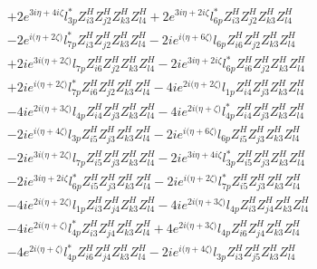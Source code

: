\begin{align}
 &+2 e^{3 i \eta +4 i \zeta } l_{3p}^* Z_{{i 3}}^{H} Z_{{j 2}}^{H} Z_{{k 3}}^{H} Z_{{l 4}}^{H} +2 e^{3 i \eta +2 i \zeta } l_{6p}^* Z_{{i 3}}^{H} Z_{{j 2}}^{H} Z_{{k 3}}^{H} Z_{{l 4}}^{H} \nonumber \\ 
 &-2 e^{i \Big(\eta +2 \zeta \Big)} l_{7p}^* Z_{{i 3}}^{H} Z_{{j 2}}^{H} Z_{{k 3}}^{H} Z_{{l 4}}^{H} -2 i e^{i \Big(\eta +6 \zeta \Big)} l_{6p} Z_{{i 6}}^{H} Z_{{j 2}}^{H} Z_{{k 3}}^{H} Z_{{l 4}}^{H} \nonumber \\ 
 &+2 i e^{3 i \Big(\eta +2 \zeta \Big)} l_{7p} Z_{{i 6}}^{H} Z_{{j 2}}^{H} Z_{{k 3}}^{H} Z_{{l 4}}^{H} -2 i e^{3 i \eta +2 i \zeta } l_{6p}^* Z_{{i 6}}^{H} Z_{{j 2}}^{H} Z_{{k 3}}^{H} Z_{{l 4}}^{H} \nonumber \\ 
 &+2 i e^{i \Big(\eta +2 \zeta \Big)} l_{7p}^* Z_{{i 6}}^{H} Z_{{j 2}}^{H} Z_{{k 3}}^{H} Z_{{l 4}}^{H} -4 i e^{2 i \Big(\eta +2 \zeta \Big)} l_{1p} Z_{{i 4}}^{H} Z_{{j 3}}^{H} Z_{{k 3}}^{H} Z_{{l 4}}^{H} \nonumber \\ 
 &-4 i e^{2 i \Big(\eta +3 \zeta \Big)} l_{4p} Z_{{i 4}}^{H} Z_{{j 3}}^{H} Z_{{k 3}}^{H} Z_{{l 4}}^{H} -4 i e^{2 i \Big(\eta +\zeta \Big)} l_{4p}^* Z_{{i 4}}^{H} Z_{{j 3}}^{H} Z_{{k 3}}^{H} Z_{{l 4}}^{H} \nonumber \\ 
 &-2 i e^{i \Big(\eta +4 \zeta \Big)} l_{3p} Z_{{i 5}}^{H} Z_{{j 3}}^{H} Z_{{k 3}}^{H} Z_{{l 4}}^{H} -2 i e^{i \Big(\eta +6 \zeta \Big)} l_{6p} Z_{{i 5}}^{H} Z_{{j 3}}^{H} Z_{{k 3}}^{H} Z_{{l 4}}^{H} \nonumber \\ 
 &-2 i e^{3 i \Big(\eta +2 \zeta \Big)} l_{7p} Z_{{i 5}}^{H} Z_{{j 3}}^{H} Z_{{k 3}}^{H} Z_{{l 4}}^{H} -2 i e^{3 i \eta +4 i \zeta } l_{3p}^* Z_{{i 5}}^{H} Z_{{j 3}}^{H} Z_{{k 3}}^{H} Z_{{l 4}}^{H} \nonumber \\ 
 &-2 i e^{3 i \eta +2 i \zeta } l_{6p}^* Z_{{i 5}}^{H} Z_{{j 3}}^{H} Z_{{k 3}}^{H} Z_{{l 4}}^{H} -2 i e^{i \Big(\eta +2 \zeta \Big)} l_{7p}^* Z_{{i 5}}^{H} Z_{{j 3}}^{H} Z_{{k 3}}^{H} Z_{{l 4}}^{H} \nonumber \\ 
 &-4 i e^{2 i \Big(\eta +2 \zeta \Big)} l_{1p} Z_{{i 3}}^{H} Z_{{j 4}}^{H} Z_{{k 3}}^{H} Z_{{l 4}}^{H} -4 i e^{2 i \Big(\eta +3 \zeta \Big)} l_{4p} Z_{{i 3}}^{H} Z_{{j 4}}^{H} Z_{{k 3}}^{H} Z_{{l 4}}^{H} \nonumber \\ 
 &-4 i e^{2 i \Big(\eta +\zeta \Big)} l_{4p}^* Z_{{i 3}}^{H} Z_{{j 4}}^{H} Z_{{k 3}}^{H} Z_{{l 4}}^{H} +4 e^{2 i \Big(\eta +3 \zeta \Big)} l_{4p} Z_{{i 6}}^{H} Z_{{j 4}}^{H} Z_{{k 3}}^{H} Z_{{l 4}}^{H} \nonumber \\ 
 &-4 e^{2 i \Big(\eta +\zeta \Big)} l_{4p}^* Z_{{i 6}}^{H} Z_{{j 4}}^{H} Z_{{k 3}}^{H} Z_{{l 4}}^{H} -2 i e^{i \Big(\eta +4 \zeta \Big)} l_{3p} Z_{{i 3}}^{H} Z_{{j 5}}^{H} Z_{{k 3}}^{H} Z_{{l 4}}^{H} \nonumber \\ 

\end{align}
